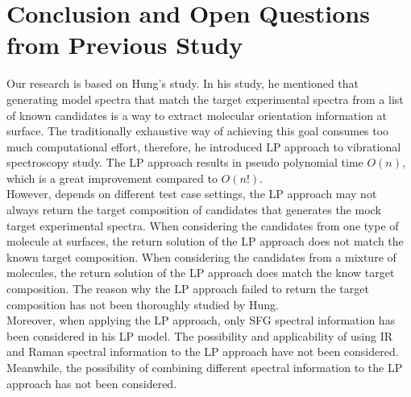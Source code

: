 \section{Conclusion and Open Questions from Previous Study \cite{KuoKaiHung:Thesis:2015}}

Our research is based on Hung's study. In his study, he mentioned that generating model spectra that match the target experimental spectra from a list of known candidates is a way to extract molecular orientation information at surface. The traditionally exhaustive way of achieving this goal consumes too much computational effort, therefore, he introduced LP approach to vibrational spectroscopy study. The LP approach results in pseudo polynomial time $O(n)$, which is a great improvement compared to $O(n!)$. \\

However, depends on different test case settings, the LP approach may not always return the target composition of candidates that generates the mock target experimental spectra. When considering the candidates from one type of molecule at surfaces, the return solution of the LP approach does not match the known target composition. When considering the candidates from a mixture of molecules, the return solution of the LP approach does match the know target composition. The reason why the LP approach failed to return the target composition has not been thoroughly studied by Hung. \\

Moreover, when applying the LP approach, only SFG spectral information has been considered in his LP model. The possibility and applicability of using IR and Raman spectral information to the LP approach have not been considered. Meanwhile, the possibility of combining different spectral information to the LP approach has not been considered. \\
	

